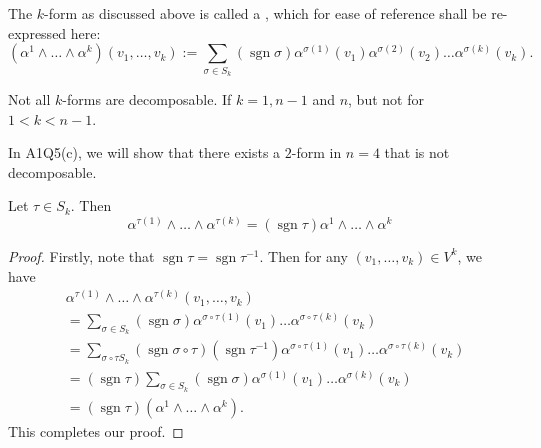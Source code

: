 \documentclass[notoc,notitlepage]{tufte-book}
\DeclareMathOperator{\sgn}{sgn}
\begin{document}
\begin{fullwidth}
\begin{defn}\label{defn:decomposable_k_form}
  The $k$-form as discussed above is called a , which for
  ease of reference shall be re-expressed here:
  \begin{equation*}
    \left( \alpha^1 \land \hdots \land \alpha^k \right) ( v_1, \ldots, v_k )
    := \sum_{\sigma \in S_k} \left( \sgn \sigma \right) \alpha^{\sigma(1)}(v_1) \alpha^{\sigma(2)}(v_2) \hdots \alpha^{\sigma(k)}(v_k).
  \end{equation*}
\end{defn}
\end{fullwidth}

\begin{note}
  Not all $k$-forms are decomposable. If $k = 1, n - 1$ and $n$, but not for $1 < k < n - 1$.
\end{note}

In A1Q5(c), we will show that there exists a $2$-form in $n = 4$ that is not decomposable.

\begin{propo}\label{propo:permutation_on_k_forms}
  Let $\tau \in S_k$. Then
  \begin{equation*}
    \alpha^{\tau(1)} \land \hdots \land \alpha^{\tau(k)}
      = ( \sgn \tau ) \alpha^1 \land \hdots \land \alpha^{k}
  \end{equation*}
\end{propo}

\begin{proof}
  Firstly, note that $\sgn \tau = \sgn \tau^{-1}$. Then for any $(v_1, \ldots, v_k) \in V^k$,
  we have
  \begin{align*}
    &\alpha^{\tau(1)} \land \hdots \land \alpha^{\tau(k)} (v_1, \ldots, v_k) \\
    &= \sum_{\sigma \in S_k} (\sgn \sigma) \alpha^{\sigma \circ \tau(1)} (v_1) \hdots \alpha^{\sigma \circ \tau (k)} (v_k) \\
    &= \sum_{\sigma \circ \tau S_k} (\sgn \sigma \circ \tau) \left(\sgn \tau^{-1}\right)
      \alpha^{\sigma \circ \tau(1)} (v_1) \hdots \alpha^{\sigma \circ \tau(k)} (v_k) \\
    &= (\sgn \tau) \sum_{\sigma \in S_k} (\sgn \sigma)
      \alpha^{\sigma(1)} (v_1) \hdots \alpha^{\sigma(k)} (v_k) \\
    &= (\sgn \tau) (\alpha^1 \land \hdots \land \alpha^k).
  \end{align*}
  This completes our proof.
\end{proof}
\end{document}
